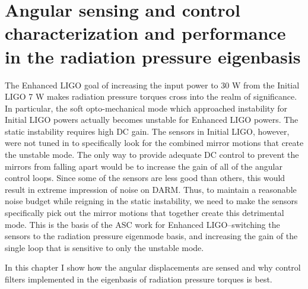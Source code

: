 \chapter{Angular sensing and control characterization and performance in the radiation pressure eigenbasis} 





The Enhanced LIGO goal of increasing the input power to 30 W from the
Initial LIGO 7 W makes radiation pressure torques cross into the realm
of significance. In particular, the soft opto-mechanical mode which
approached instability for Initial LIGO powers actually becomes
unstable for Enhanced LIGO powers. The static instability requires
high DC gain. The sensors in Initial LIGO, however, were not tuned in
to specifically look for the combined mirror motions that create the
unstable mode. The only way to provide adequate DC control to prevent
the mirrors from falling apart would be to increase the gain of all of
the angular control loops. Since some of the sensors are less good
than others, this would result in extreme impression of noise on
DARM. Thus, to maintain a reasonable noise budget while reigning in
the static instability, we need to make the sensors specifically pick
out the mirror motions that together create this detrimental
mode. This is the basis of the ASC work for Enhanced LIGO--switching
the sensors to the radiation pressure eigenmode basis, and increasing
the gain of the single loop that is sensitive to only the unstable mode. 

In this chapter I show how the angular displacements are sensed and
why control filters implemented in the eigenbasis of radiation
pressure torques is best. 





